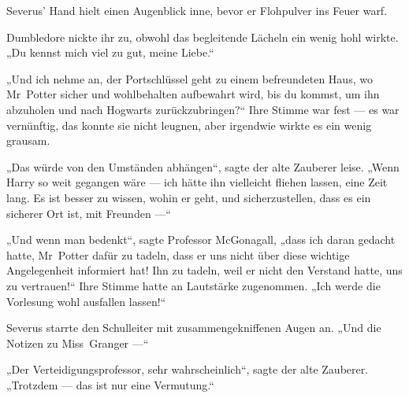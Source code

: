 Severus’ Hand hielt einen Augenblick inne, bevor er Flohpulver ins Feuer warf.

Dumbledore nickte ihr zu, obwohl das begleitende Lächeln ein wenig hohl wirkte.
„Du kennst mich viel zu gut, meine Liebe.“

„Und ich nehme an, der Portschlüssel geht zu einem befreundeten Haus, wo Mr~Potter sicher und wohlbehalten aufbewahrt wird, bis du kommst, um ihn abzuholen und nach Hogwarts zurückzubringen?“ Ihre Stimme war fest — es war vernünftig, das konnte sie nicht leugnen, aber irgendwie wirkte es ein wenig grausam.

„Das würde von den Umständen abhängen“, sagte der alte Zauberer leise.
„Wenn Harry so weit gegangen wäre — ich hätte ihn vielleicht fliehen lassen, eine Zeit lang. Es ist besser zu wissen, wohin er geht, und sicherzustellen, dass es ein sicherer Ort ist, mit Freunden —“

„Und wenn man bedenkt“, sagte Professor McGonagall, „dass ich daran gedacht hatte, Mr~Potter dafür zu tadeln, dass er uns nicht über diese wichtige Angelegenheit informiert hat! Ihn zu tadeln, weil er nicht den Verstand hatte, uns zu vertrauen!“ Ihre Stimme hatte an Lautstärke zugenommen.
„Ich werde die Vorlesung wohl ausfallen lassen!“

Severus starrte den Schulleiter mit zusammengekniffenen Augen an.
„Und die Notizen zu Miss~Granger —“

„Der Verteidigungsprofessor, sehr wahrscheinlich“, sagte der alte Zauberer.
„Trotzdem — das ist nur eine Vermutung.“

